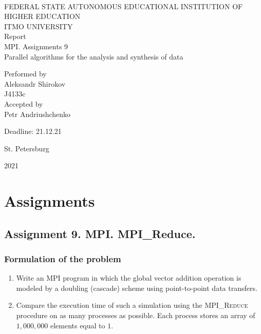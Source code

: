 \documentclass[%
12pt, %
final, %
oneside, %
onecolumn, %
centertags]{article} %
\theoremstyle{plain}
\theoremstyle{definition}
\theoremstyle{remark}
\begin{document}
	\begin{titlepage} 
		\begin{center}
		\textbf{}\\[2.0cm]
		\LARGE FEDERAL STATE AUTONOMOUS EDUCATIONAL INSTITUTION OF HIGHER EDUCATION \\[0.5cm]
		\Large ITMO UNIVERSITY \\[3cm]
		\LARGE Report\\
		\Large MPI. Assignments $9$ \\
		\Large Parallel algorithms for the analysis and synthesis of data \\[4cm]


		\begin{flushright}
		Performed by\\
		Aleksandr Shirokov\\
		J4133c\\
		Accepted by\\
		Petr Andriushchenko

		Deadline: 21.12.21
		\end{flushright}

		\vfill 

		{\Large {St. Petersburg}} \par
		{\Large {2021}}
		\end{center} 
	\end{titlepage}

\tableofcontents
\newpage


\section{Assignments}

\subsection{Assignment 9. MPI. MPI\_Reduce.}

\subsubsection{Formulation of the problem}

\begin{enumerate}
	\item Write an MPI program in which the global vector addition operation is modeled by a 
doubling (cascade) scheme using point-to-point data transfers.
	\item Compare the execution time of such a simulation using the \textsc{MPI\_Reduce} procedure on as many processes as possible. Each process stores an array of $1,000,000$ elements equal to $1$.
\end{enumerate}
\end{document}
